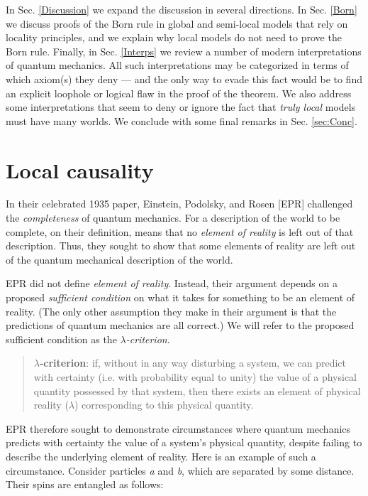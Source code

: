 \documentclass[a4paper]{article}
\begin{document}
In Sec. \ref{Discussion} we expand the discussion in several directions. In Sec. \ref{Born} we discuss proofs of the Born rule in global and semi-local models that rely on locality principles, and we explain why local models do not need to prove the Born rule. Finally, in Sec. \ref{Interps} we review a number of modern interpretations of quantum mechanics. All such interpretations may be categorized in terms of which axiom(s) they deny --- and the only way to evade this fact would be to find an explicit loophole or logical flaw in the proof of the theorem. We also address some interpretations that seem to deny or ignore the fact that \textit{truly local} models must have many worlds. We conclude with some final remarks in Sec. \ref{sec:Conc}.



\section{Local causality} \label{Locality}

In their celebrated 1935 paper, Einstein, Podolsky, and Rosen [EPR] challenged the \textit{completeness} of quantum mechanics. For a description of the world to be complete, on their definition, means that no \textit{element of reality} is left out of that description. Thus, they sought to show that some elements of reality are left out of the quantum mechanical description of the world.

EPR did not define \textit{element of reality}. Instead, their argument depends on a proposed \textit{sufficient condition} on what it takes for something to be an element of reality. (The only other assumption they make in their argument is that the predictions of quantum mechanics are all correct.) We will refer to the proposed sufficient condition as the \textit{$\lambda$-criterion}. 

\begin{quote}
\textbf{$\lambda$-criterion}: if, without in any way disturbing a system, we can predict with certainty (i.e. with probability equal to unity) the value of a physical quantity possessed by that system, then there exists an element of physical reality ($\lambda$) corresponding to this physical quantity.
\end{quote}

EPR therefore sought to demonstrate circumstances where quantum mechanics predicts with certainty the value of a system's physical quantity, despite failing to describe the underlying element of reality. Here is an example of such a circumstance. Consider particles \textit{a} and \textit{b}, which are separated by some distance. Their spins are entangled as follows:
\end{document}
